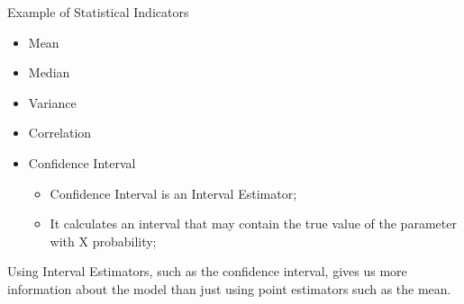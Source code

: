 \begin{frame}[t]{Example of Statistical Indicators}
  \begin{itemize}
    \item Mean
    \item Median
    \item Variance
    \item Correlation
    \item Confidence Interval
    \begin{itemize}
      \item Confidence Interval is an Interval Estimator;
      \item It calculates an interval that may contain the true value of the parameter with X probability;
    \end{itemize}

  \end{itemize}\bigskip

  Using Interval Estimators, such as the confidence interval, gives us more
  information about the model than just using point estimators such as the
  mean.
\end{frame}
